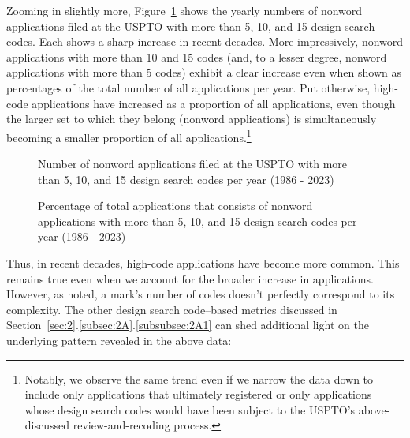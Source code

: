 \documentclass[letterpaper, 11pt, oneside]{article}
\begin{document}
Zooming in slightly more, Figure~\ref{fig:6} shows the yearly numbers of nonword applications filed at the USPTO with more than 5, 10, and 15 design search codes. Each shows a sharp increase in recent decades. More impressively, nonword applications with more than 10 and 15 codes (and, to a lesser degree, nonword applications with more than 5 codes) exhibit a clear increase even when shown as percentages of the total number of all applications per year. Put otherwise, high-code applications have increased as a proportion of all applications, even though the larger set to which they belong (nonword applications) is simultaneously becoming a smaller proportion of all applications.\footnote{Notably, we observe the same trend even if we narrow the data down to include only applications that ultimately registered or only applications whose design search codes would have been subject to the USPTO's above-discussed review-and-recoding process.}

\begin{figure}[H]
\centering

\caption{\label{fig:6} Number of nonword applications filed at the USPTO with more than 5, 10, and 15 design search codes per year (1986 - 2023)}
\end{figure}

\begin{figure}[H]
\centering

\caption{\label{fig:7} Percentage of total applications that consists of nonword applications with more than 5, 10, and 15 design search codes per year (1986 - 2023)}
\end{figure}

Thus, in recent decades, high-code applications have become more common. This remains true even when we account for the broader increase in applications. However, as noted, a mark's number of codes doesn't perfectly correspond to its complexity. The other design search code–based metrics discussed in Section~\ref{sec:2}.\ref{subsec:2A}.\ref{subsubsec:2A1} can shed additional light on the underlying pattern revealed in the above data:
\end{document}
